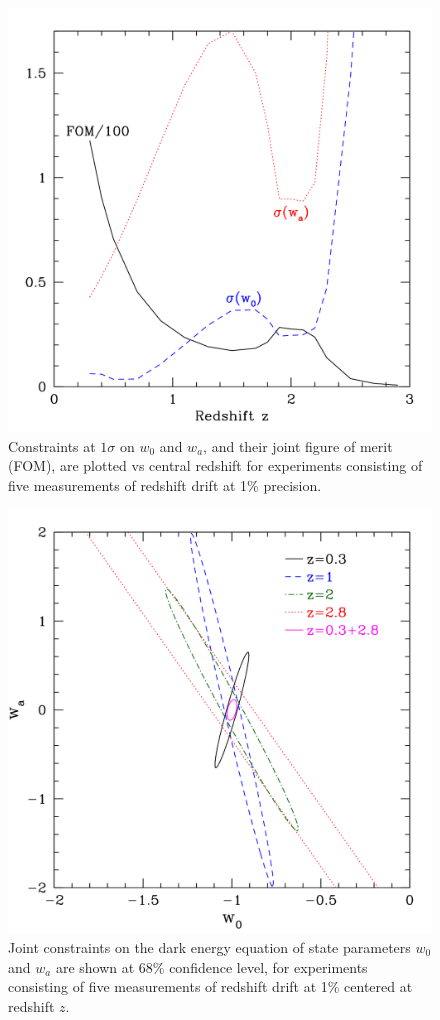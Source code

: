 \documentclass[preprint2, 10pt]{aastex}
\begin{document}
\begin{figure}[!htbp] 
   \centering
  \includegraphics[width=\columnwidth]{fom.pdf}
\caption{Constraints at $1\sigma$ on $w_0$ and $w_a$, and their joint 
figure of merit (FOM), are plotted vs central redshift for experiments 
consisting of five measurements of redshift drift at 1\% precision. 
} 
\label{fig:fom} 
\end{figure}


\begin{figure}[!htbp] 
   \centering
  \includegraphics[width=\columnwidth]{w0wazplus.pdf}
\caption{Joint constraints on the dark energy equation of state parameters 
$w_0$ and $w_a$ are shown at 68\% confidence level, for experiments 
consisting of five measurements of redshift drift at 1\% centered at 
redshift $z$. 
} 
\label{fig:fisher} 
\end{figure}
\end{document}
